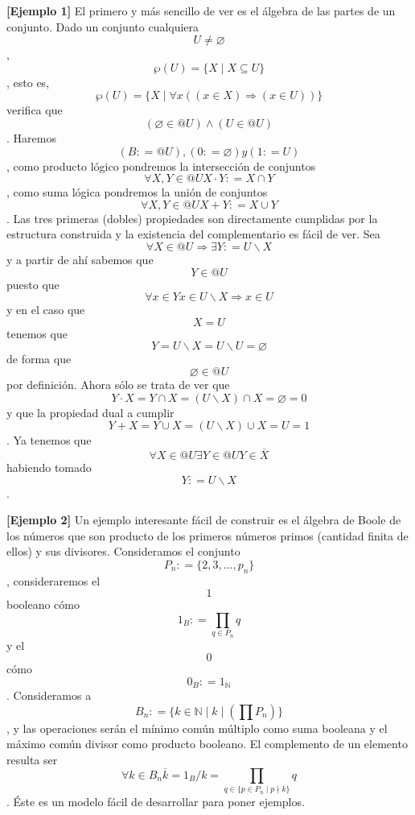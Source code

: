 \documentclass[
]{article}
\begin{document}
\begin{enumerate}
  \textbf{{[}Ejemplo 1{]} }El primero y más sencillo de ver es el
  álgebra de las partes de un conjunto. Dado un conjunto
  cualquiera\[U \neq \varnothing\],
  \[{\wp(U)} = {\{{X \mid {X \subseteq U}}\}}\], esto es,
  \[{\wp(U)} = {\{{X \mid {{\forall x}\left( {{({x \in X})}\Rightarrow{({x \in U})}} \right)}}\}}\]
  verifica
  que\[\left( {{\varnothing \in @}U} \right) \land \left( {{U \in @}U} \right)\].
  Ha\-remos\[\left( {B{: = @}U} \right),\left( {0{: = \varnothing}} \right)y\left( {1{: = U}} \right)\],
  como producto lógico pondremos la intersección de
  conjuntos\[\forall X,{Y \in @}U{X \cdot Y}{: = {X \cap Y}}\], como
  suma lógica pondremos la unión de
  conjuntos\[\forall X,{Y \in @}U{X + Y}{: = {X \cup Y}}\]. Las tres
  primeras (dobles) propiedades son di\-rectamente cumplidas por la
  estructura construida y la existencia del complementario es fá\-cil de
  ver. Sea
  \[\forall{X \in @}U\Rightarrow\exists Y{: = {U \smallsetminus X}}\]y a
  partir de ahí sabemos que\[{Y \in @}U\]puesto
  que\[\forall{x \in Y}{x \in {U \smallsetminus X}}\Rightarrow{x \in U}\]y
  en el caso que\[X = U\]tenemos que
  \[{{Y = {U \smallsetminus X}} = {U \smallsetminus U}} = \varnothing\]de
  forma que\[{\varnothing \in @}U\]por definición. Ahora sólo se trata
  de ver
  que\[{{{{Y \cdot X} = {Y \cap X}} = {{({U \smallsetminus X})} \cap X}} = \varnothing} = 0\]y
  que la propiedad dual a
  cumplir\[{{{{Y + X} = {Y \cup X}} = {{({U \smallsetminus X})} \cup X}} = U} = 1\].
  Ya tenemos
  que\[\forall{X \in @}U\exists{Y \in @}U{Y \in \overline{X}}\]ha\-biendo
  tomado\[Y{: = {U \smallsetminus X}}\].

  \textbf{{[}Ejemplo 2{]}} Un ejemplo interesante fácil de construir es
  el álgebra de Boole de los números que son producto de los primeros
  núme\-ros primos (cantidad finita de ellos) y sus divisores.
  Consideramos el conjunto \[P_{n}{: = {\{{2,3,\ldots,p_{n}}\}}}\],
  con\-sideraremos el \[1\] booleano
  cómo\[1_{B}{: = {\prod\limits_{q \in P_{n}}q}}\]y el \[0\]
  cómo\[0_{B}{: = 1_{\mathbb{N}}}\]. Consideramos a
  \[B_{n}{: = {\{{{k \in \mathbb{N}} \mid {k \mid \left( {\prod P_{n}} \right)}}\}}}\],
  y las operaciones serán el mínimo común múltiplo como suma booleana y
  el máximo común divisor como producto booleano. El complemento de un
  ele\-mento resulta ser
  \[\forall{k \in B_{n}}{{\overline{k} = {1_{B}/k}} = {\prod\limits_{q \in {\{{{{p \in P_{n}} \mid p} \nmid k}\}}}q}}\].
  Éste es un modelo fácil de desarrollar para poner ejemplos.


\end{enumerate}
\end{document}
